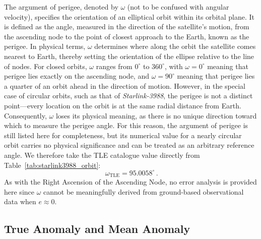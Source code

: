 \documentclass{article}
\begin{document}
The argument of perigee, denoted by $\omega$ (not to be confused with angular velocity), specifies the orientation of an elliptical orbit within its orbital plane. It is defined as the angle, measured in the direction of the satellite’s motion, from the ascending node to the point of closest approach to the Earth, known as the perigee. In physical terms, $\omega$ determines where along the orbit the satellite comes nearest to Earth, thereby setting the orientation of the ellipse relative to the line of nodes. For closed orbits, $\omega$ ranges from $0^{\circ}$ to $360^{\circ}$, with $\omega = 0^{\circ}$ meaning that perigee lies exactly on the ascending node, and $\omega = 90^{\circ}$ meaning that perigee lies a quarter of an orbit ahead in the direction of motion. However, in the special case of circular orbits, such as that of \textit{Starlink-3988}, the perigee is not a distinct point—every location on the orbit is at the same radial distance from Earth. Consequently, $\omega$ loses its physical meaning, as there is no unique direction toward which to measure the perigee angle. For this reason, the argument of perigee is still listed here for completeness, but its numerical value for a nearly circular orbit carries no physical significance and can be treated as an arbitrary reference angle. We therefore take the TLE catalogue value directly from Table~\ref{tab:starlink3988_orbit}:
\[
\boxed{\,\omega_{\mathrm{TLE}} = 95.0058^{\circ}\,}.
\]
As with the Right Ascension of the Ascending Node, no error analysis is provided here since $\omega$ cannot be meaningfully derived from ground-based observational data when $e \approx 0$.

\subsection{True Anomaly and Mean Anomaly} \label{true_anomaly}
\end{document}
